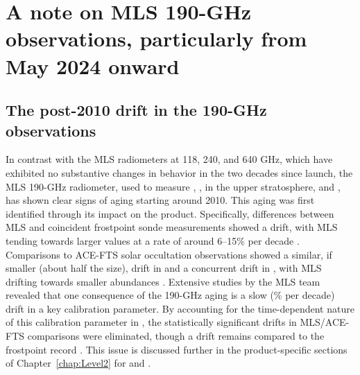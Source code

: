 \section{A note on MLS 190-GHz observations, particularly from May 2024 onward}
\subsection{The post-2010 drift in the 190-GHz observations}
\label{sec:R2Drift}

In contrast with the MLS radiometers at 118, 240, and 640 GHz, which have exhibited no substantive changes in behavior in the two decades since launch, the MLS \mbox{190-GHz} radiometer, used to measure , ,  in the upper stratosphere, and , has shown clear signs of aging starting around 2010.  This aging was first identified through its impact on the  product.  Specifically, differences between MLS \viv {} and coincident frostpoint sonde measurements showed a drift, with MLS tending towards larger values at a rate of around 6--15\% per decade \citep{HurstEtal:2016}.  Comparisons to ACE-FTS solar occultation observations showed a similar, if smaller (about half the size), drift in  and a concurrent drift in , with MLS  drifting towards smaller abundances \citep{LiveseyEtal:2021:Drifts}.  Extensive studies by the MLS team revealed that one consequence of the \mbox{190-GHz} aging is a slow (\% per decade) drift in a key calibration parameter.  By accounting for the time-dependent nature of this calibration parameter in \prevv, the statistically significant drifts in MLS/ACE-FTS  comparisons were eliminated, though a drift remains compared to the frostpoint record \citep{LiveseyEtal:2021:Drifts}. This issue is discussed further in the product-specific sections of Chapter~\ref{chap:Level2} for  and .  

